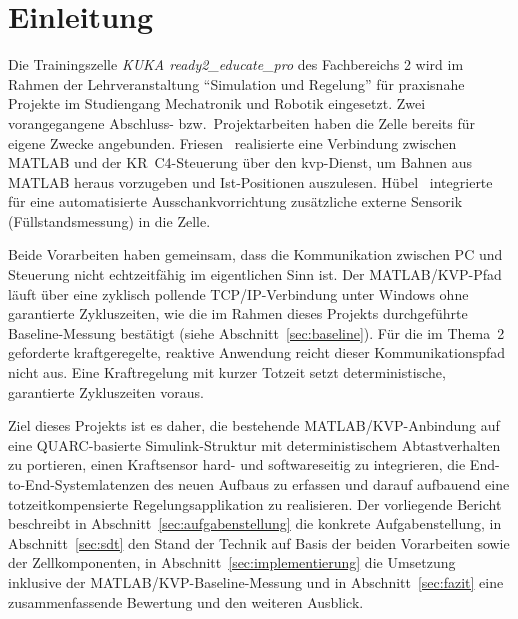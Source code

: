 
\section{Einleitung}
\label{sec:einleitung}


Die Trainingszelle \textit{KUKA ready2\_educate\_pro} des Fachbereichs 2 wird im
Rahmen der Lehrveranstaltung \enquote{Simulation und Regelung} für praxisnahe
Projekte im Studiengang Mechatronik und Robotik eingesetzt. Zwei vorangegangene
Abschluss- bzw.\ Projektarbeiten haben die Zelle bereits für eigene Zwecke
angebunden. Friesen~\cite{friesen2021} realisierte eine Verbindung zwischen
MATLAB und der KR~C4-Steuerung über den \ac{kvp}-Dienst, um Bahnen aus MATLAB
heraus vorzugeben und Ist-Positionen auszulesen. Hübel~\cite{huebel2022}
integrierte für eine automatisierte Ausschankvorrichtung zusätzliche externe
Sensorik (Füllstandsmessung) in die Zelle.

Beide Vorarbeiten haben gemeinsam, dass die Kommunikation zwischen PC und
Steuerung nicht echtzeitfähig im eigentlichen Sinn ist. 
Der MATLAB/KVP-Pfad läuft über eine zyklisch pollende TCP/IP-Verbindung unter Windows ohne garantierte Zykluszeiten, wie die im Rahmen dieses Projekts durchgeführte Baseline-Messung bestätigt (siehe Abschnitt~\ref{sec:baseline}). 
Für die im Thema~2 geforderte kraftgeregelte, reaktive Anwendung reicht dieser
Kommunikationspfad nicht aus.
Eine Kraftregelung mit kurzer Totzeit setzt
deterministische, garantierte Zykluszeiten voraus.

Ziel dieses Projekts ist es daher, die bestehende MATLAB/KVP-Anbindung auf
eine QUARC-basierte Simulink-Struktur mit deterministischem Abtastverhalten
zu portieren, einen Kraftsensor hard- und softwareseitig zu integrieren, die
End-to-End-Systemlatenzen des neuen Aufbaus zu erfassen und darauf
aufbauend eine totzeitkompensierte Regelungsapplikation zu realisieren. 
Der vorliegende Bericht beschreibt in Abschnitt~\ref{sec:aufgabenstellung} die
konkrete Aufgabenstellung, in Abschnitt~\ref{sec:sdt} den Stand der Technik
auf Basis der beiden Vorarbeiten sowie der Zellkomponenten, in
Abschnitt~\ref{sec:implementierung} die Umsetzung inklusive der
MATLAB/KVP-Baseline-Messung und in Abschnitt~\ref{sec:fazit} eine
zusammenfassende Bewertung und den weiteren Ausblick.
